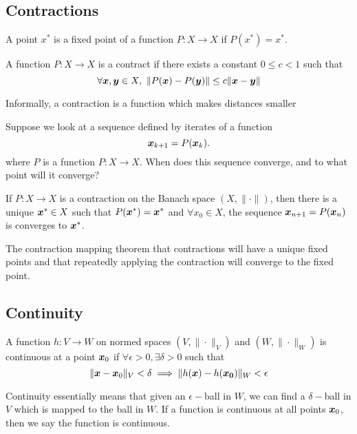 \subsection{Contractions}
\begin{definition}
	A point $x^*$ is a fixed point of a function $P:X\to X$ if $P(x^*)=x^*$.
	\label{defn:fixed-point}
\end{definition}
\begin{definition}
	A function $P:X\to X$ is a contract if there exists a constant $0\leq c < 1$
	such that \[
		\forall \bs{x},\bs{y}\in X,\ \|P(\bs{x}) - P(\bs{y})\| \leq c
		\|\bs{x}-\bs{y}\|
	\]
	\label{defn:contraction}
\end{definition}
Informally, a contraction is a function which makes distances smaller 

Suppose we look at a sequence defined by iterates of a function \[
	\boldsymbol{x}_{k+1} = P(\boldsymbol{x}_k).
\]
where $P$ is a function $P:X\to X$. When does this sequence converge, and to
what point will it converge?
\begin{theorem}
	If $P:X\to X$ is a contraction on the Banach space $(X, \|\cdot\|)$, then
	there is a unique $\boldsymbol{x}^*\in X$ such that $P(\boldsymbol{x}^*) = \boldsymbol{x}^*$ and
	$\forall x_0\in X$, the sequence $\boldsymbol{x}_{n+1} = P(\boldsymbol{x}_n)$ is converges to
	$\boldsymbol{x}^*$.
	\label{thm:contraction-mapping}
\end{theorem}
The contraction mapping theorem that contractions will have a unique fixed
points and that repeatedly applying the contraction will converge to the fixed
point.

\subsection{Continuity}
\begin{definition}
	A function $h:V\to W$ on normed spaces $(V, \|\cdot\|_V)$ and $(W,
	\|\cdot\|_W)$ is continuous at a point $\boldsymbol{x}_0$ if $\forall \epsilon > 0,
	\exists \delta > 0$ such that \[
		\|\boldsymbol{x}-\boldsymbol{x}_0\|_V < \delta \implies \|h(\boldsymbol{x}) - h(\boldsymbol{x_0})\|_W < \epsilon
	\]
	\label{thm:continuity}
\end{definition}
Continuity essentially means that given an $\epsilon-$ball in $W$, we can find a
$\delta-$ball in $V$ which is mapped to the ball in $W$.
If a function is continuous at all points $\boldsymbol{x}_0$, then we say the function
is continuous.

